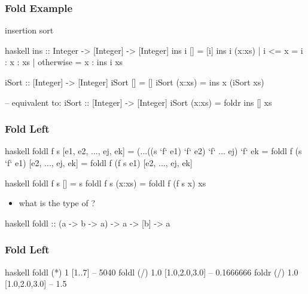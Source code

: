 \documentclass[dvipsnames]{beamer}
\theoremstyle{plain}
\begin{document}
\begin{frame}[fragile]
  \frametitle{Fold Example}

  \begin{exampleblock}{insertion sort}
    \begin{pygments}{haskell}
ins :: Integer -> [Integer] -> [Integer]
ins i []      = [i]
ins i (x:xs)
  | i <= x    = i : x : xs
  | otherwise = x : ins i xs

iSort :: [Integer] -> [Integer]
iSort []     = []
iSort (x:xs) = ins x (iSort xs)

-- equivalent to:
iSort :: [Integer] -> [Integer]
iSort (x:xs) = foldr ins [] xs
    \end{pygments}
  \end{exampleblock}
\end{frame}

\begin{frame}[fragile]
  \frametitle{Fold Left}

  \begin{block}{}
    \begin{pygments}{haskell}
foldl f s [e1, e2, ..., ej, ek]
    = (...((s `f` e1) `f` e2) `f` ... ej) `f` ek
    = foldl f (s `f` e1) [e2, ..., ej, ek]
    = foldl f (f s e1) [e2, ..., ej, ek]
    \end{pygments}
  \end{block}

  \pause
  \begin{exampleblock}{}
    \begin{pygments}{haskell}
foldl f s []     = s
foldl f s (x:xs) = foldl f (f s x) xs
    \end{pygments}
  \end{exampleblock}

  \pause
  \begin{itemize}
    \item what is the type of ?
  \end{itemize}

  \begin{pygments}{haskell}
foldl :: (a -> b -> a) -> a -> [b] -> a
  \end{pygments}
\end{frame}

\begin{frame}[fragile]
  \frametitle{Fold Left}

  \begin{exampleblock}{}
    \begin{pygments}{haskell}
foldl (*) 1 [1..7]           -- 5040
foldl (/) 1.0 [1.0,2.0,3.0]  -- 0.1666666
foldr (/) 1.0 [1.0,2.0,3.0]  -- 1.5
    \end{pygments}
  \end{exampleblock}
\end{frame}
\end{document}
